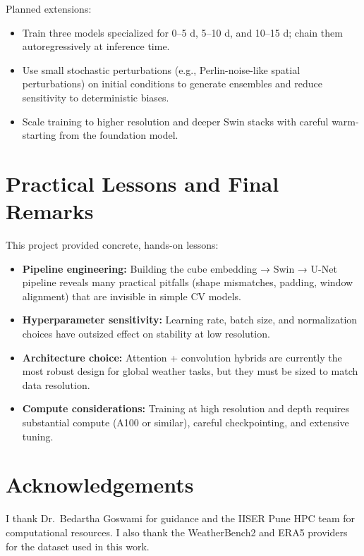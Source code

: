\documentclass[12pt]{report}
\begin{document}
Planned extensions:
\begin{itemize}
  \item Train three models specialized for 0–5 d, 5–10 d, and 10–15 d; chain them autoregressively at inference time.
  \item Use small stochastic perturbations (e.g., Perlin-noise-like spatial perturbations) on initial conditions to generate ensembles and reduce sensitivity to deterministic biases.
  \item Scale training to higher resolution and deeper Swin stacks with careful warm-starting from the foundation model.
\end{itemize}

\chapter{Practical Lessons and Final Remarks}

This project provided concrete, hands-on lessons:

\begin{itemize}
  \item \textbf{Pipeline engineering:} Building the cube embedding → Swin → U-Net pipeline reveals many practical pitfalls (shape mismatches, padding, window alignment) that are invisible in simple CV models.
  \item \textbf{Hyperparameter sensitivity:} Learning rate, batch size, and normalization choices have outsized effect on stability at low resolution.
  \item \textbf{Architecture choice:} Attention + convolution hybrids are currently the most robust design for global weather tasks, but they must be sized to match data resolution.
  \item \textbf{Compute considerations:} Training at high resolution and depth requires substantial compute (A100 or similar), careful checkpointing, and extensive tuning.
\end{itemize}

\chapter*{Acknowledgements}

I thank Dr.~Bedartha Goswami for guidance and the IISER Pune HPC team for computational resources. I also thank the WeatherBench2 and ERA5 providers for the dataset used in this work.
\end{document}
